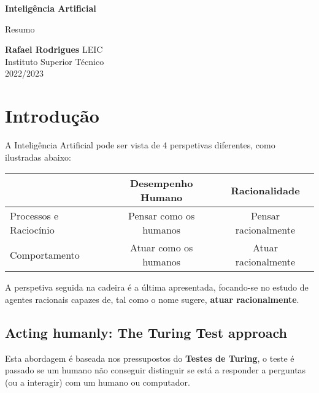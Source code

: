 \documentclass[12pt]{article}
\begin{document}
\begin{titlepage}
    \begin{center}
        \vspace*{1cm}

        \textbf{\LARGE Inteligência Artificial}
        \vspace{0.5cm}

        \Large Resumo
        \vspace{1.5cm}

        \textbf{Rafael Rodrigues}
        \vfill
        LEIC \\
        Instituto Superior Técnico \\
        2022/2023
    \end{center}
\end{titlepage}

\tableofcontents

\newpage

\section{Introdução}

A Inteligência Artificial pode ser vista de 4 perspetivas diferentes, como ilustradas abaixo:

\begin{tabular}[t]{ | l | c | c | }
    \hline
        & Desempenho Humano & Racionalidade \\\hline
    Processos e Raciocínio & Pensar como os humanos & Pensar racionalmente \\\hline
    Comportamento & Atuar como os humanos & Atuar racionalmente \\\hline
\end{tabular}
\vspace{10pt}

A perspetiva seguida na cadeira é a última apresentada, focando-se no estudo de agentes racionais capazes de, tal como o nome sugere, \textbf{atuar racionalmente}.

\subsection{Acting humanly: The Turing Test approach}

Esta abordagem é baseada nos pressupostos do \textbf{Testes de Turing}, o teste é passado se um humano não conseguir distinguir se está a responder a perguntas (ou a interagir) com um humano ou computador. \vspace{10pt}
\end{document}
